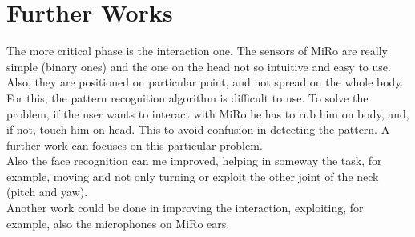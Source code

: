 \documentclass[12pt,peerreviewca, a4paper, onecolumn]{IEEEtran}
\begin{document}
	\section{Further Works}
	The more critical phase is the interaction one. The sensors of MiRo are really simple (binary ones) and the one on the head not so intuitive and easy to use. Also, they are positioned on particular point, and not spread on the whole body. For this, the pattern recognition algorithm is difficult to use. To solve the problem, if the user wants to interact with MiRo he has to rub him on body, and, if not, touch him on head. This to avoid confusion in detecting the pattern. A further work can focuses on this particular problem.\\
	Also the face recognition can me improved, helping in someway the task, for example, moving and not only turning or exploit the other joint of the neck (pitch and yaw).\\
	Another work could be done in improving the interaction, exploiting, for example, also the microphones on MiRo ears.
 
	 
		

	
\end{document}
